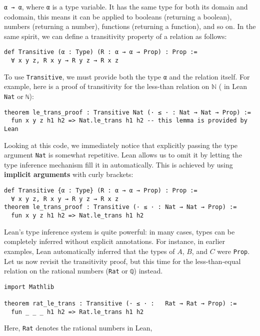 \lstinline[language=lean]|α → α|, where 
\lstinline[language=lean]|α| is a type variable. 
It has the same type for 
both its domain and codomain, this means it can be 
applied to booleans (returning a boolean), numbers (returning a number), 
functions (returning a function), and so on.
In the same spirit, we can define a transitivity property of a relation as follows:
\begin{lstlisting}[language=lean]
def Transitive (α : Type) (R : α → α → Prop) : Prop :=
  ∀ x y z, R x y → R y z → R x z
\end{lstlisting}
To use \lstinline[language=lean]|Transitive|, we must provide both the type 
\lstinline[language=lean]|α| and the relation itself. 
For example, here is a proof of transitivity for the less-than relation on
 $\mathbb{N}$ ( in Lean \lstinline[language=lean]|Nat| or \lstinline[language=lean]|ℕ|):
\begin{lstlisting}[language=lean]
theorem le_trans_proof : Transitive Nat (· ≤ · : Nat → Nat → Prop) :=
  fun x y z h1 h2 => Nat.le_trans h1 h2 -- this lemma is provided by Lean 
\end{lstlisting}
Looking at this code, we immediately notice that explicitly 
passing the type argument \lstinline[language=lean]|Nat| is somewhat repetitive. 
Lean allows us to omit it by letting the type inference mechanism fill it in automatically.
 This is achieved by using \textbf{implicit arguments} with curly brackets:
\begin{lstlisting}[language=lean]
def Transitive {α : Type} (R : α → α → Prop) : Prop :=
  ∀ x y z, R x y → R y z → R x z
theorem le_trans_proof : Transitive (· ≤ · : Nat → Nat → Prop) :=
  fun x y z h1 h2 => Nat.le_trans h1 h2 
\end{lstlisting}
Lean's type inference system is quite powerful: in many cases, types can be completely 
inferred without explicit annotations. For instance, in earlier examples, Lean automatically 
inferred that the types of $A$, $B$, and $C$ were \lstinline[language=lean]|Prop|.
Let us now revisit the transitivity proof, but this time for the less-than-equal relation on 
the rational numbers (\lstinline[language=lean]|Rat| or \lstinline[language=lean]|ℚ|) instead.
\begin{lstlisting}[language=lean]
import Mathlib

theorem rat_le_trans : Transitive (· ≤ · :   Rat → Rat → Prop) :=
  fun _ _ _ h1 h2 => Rat.le_trans h1 h2
\end{lstlisting}
Here, \lstinline[language=lean]|Rat| denotes the rational numbers in Lean, 

